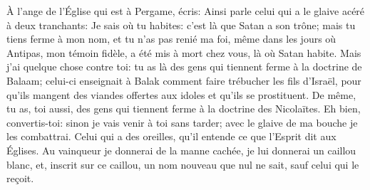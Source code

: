 À l’ange de l’Église qui est à Pergame, écris:
	Ainsi parle celui qui a le glaive acéré à deux tranchants:
	Je sais où tu habites: c’est là que Satan a son trône;
	mais tu tiens ferme à mon nom, et tu n’as pas renié ma foi,
	même dans les jours où Antipas, mon témoin fidèle,
	a été mis à mort chez vous, là où Satan habite.
Mais j’ai quelque chose contre toi:
	tu as là des gens qui tiennent ferme à la doctrine de Balaam;
	celui-ci enseignait à Balak comment faire trébucher les fils d’Israël,
	pour qu’ils mangent des viandes offertes aux idoles et qu’ils se prostituent.
De même, tu as, toi aussi,
	des gens qui tiennent ferme à la doctrine des Nicolaïtes.
Eh bien, convertis-toi: sinon je vais venir à toi sans tarder;
	avec le glaive de ma bouche je les combattrai.
Celui qui a des oreilles, qu’il entende ce que l’Esprit dit aux Églises.
Au vainqueur je donnerai de la manne cachée,
	je lui donnerai un caillou blanc, et, inscrit sur ce caillou,
	un nom nouveau que nul ne sait, sauf celui qui le reçoit.
